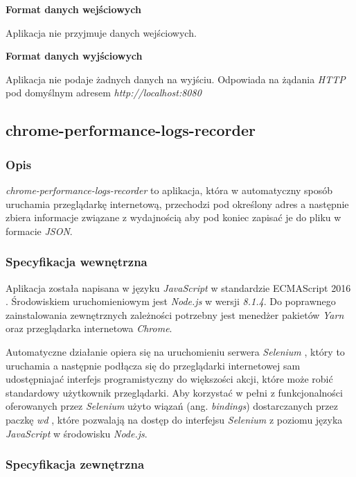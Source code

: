 \documentclass[polish, twoside, 12pt]{mwart}
\begin{document}
\textbf{Format danych wejściowych} \newline

Aplikacja nie przyjmuje danych wejściowych. \newline

\textbf{Format danych wyjściowych} \newline

Aplikacja nie podaje żadnych danych na wyjściu. Odpowiada na żądania \emph{HTTP} pod domyślnym adresem \emph{http://localhost:8080}

\subsection{chrome-performance-logs-recorder}

\subsubsection{Opis}

\emph{chrome-performance-logs-recorder} to aplikacja, która w automatyczny sposób uruchamia przeglądarkę internetową, przechodzi pod określony adres a następnie zbiera informacje związane z wydajnością aby pod koniec zapisać je do pliku w formacie \emph{JSON}. 

\subsubsection{Specyfikacja wewnętrzna}

Aplikacja została napisana w języku \emph{JavaScript} w standardzie ECMAScript 2016 \cite{es2016}. Środowiskiem uruchomieniowym jest \emph{Node.js} \cite{node.js} w wersji \emph{8.1.4}. Do poprawnego zainstalowania zewnętrznych zależności potrzebny jest menedżer pakietów \emph{Yarn} \cite{yarn} oraz przeglądarka internetowa \emph{Chrome}.

Automatyczne działanie opiera się na uruchomieniu serwera \emph{Selenium} \cite{selenium}, który to uruchamia a następnie podłącza się do przeglądarki internetowej sam udostępniajać interfejs programistyczny do większości akcji, które może robić standardowy użytkownik przeglądarki. Aby korzystać w pełni z funkcjonalności oferowanych przez \emph{Selenium} użyto wiązań (ang. \emph{bindings}) dostarczanych przez paczkę \emph{wd} \cite{wd}, które pozwalają na dostęp do interfejsu \emph{Selenium} z poziomu języka \emph{JavaScript} w środowisku \emph{Node.js}.

\subsubsection{Specyfikacja zewnętrzna}
\end{document}
